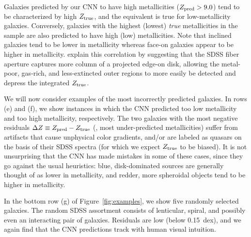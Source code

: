 \documentclass[fleqn,usenatbib]{mnras}
\begin{document}
Galaxies predicted by our CNN to have high metallicities ($Z_{\rm pred} > 9.0$) tend to be characterized by high $Z_{\rm true}$, and the equivalent is true for low-metallicity galaxies. Conversely, galaxies with the highest (lowest) \textit{true} metallicities in the sample are also predicted to have high (low) metallicities. Note that inclined galaxies tend to be lower in metallicity whereas face-on galaxies appear to be higher in metallicity. \cite{Tremonti2004} explain this correlation by suggesting that the SDSS fiber aperture captures more column of a projected edge-on disk, allowing the metal-poor, gas-rich, and less-extincted outer regions to more easily be detected and depress the integrated $Z_{\rm true}$.

We will now consider examples of the most incorrectly predicted galaxies. In rows (e) and (f), we show instances in which the CNN predicted too low metallicity and too high metallicity, respectively. The two galaxies with the most negative residuals $\Delta Z \equiv Z_{\rm pred} - Z_{\rm true}$ (\ie, most under-predicted metallicities) suffer from artifacts that cause unphysical color gradients, and/or are labeled as quasars on the basis of their SDSS spectra (for which we expect $Z_{\rm true}$ to be biased). It is not unsurprising that the CNN has made mistakes in some of these cases, since they go against the usual heuristics: blue, disk-dominated sources are generally thought of as lower in metallicity, and redder, more spheroidal objects tend to be higher in metallicity.

In the bottom row (g) of Figure~\ref{fig:examples}, we show five randomly selected galaxies. The random SDSS assortment consists of lenticular, spiral, and possibly even an interacting pair of galaxies. Residuals are low (below 0.15~dex), and we again find that the CNN predictions track with human visual intuition.
\end{document}
